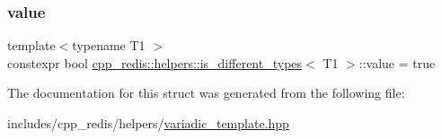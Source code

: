 \subsubsection{\texorpdfstring{value}{value}}
{\footnotesize\ttfamily template$<$typename T1 $>$ \\
constexpr bool \hyperlink{structcpp__redis_1_1helpers_1_1is__different__types}{cpp\+\_\+redis\+::helpers\+::is\+\_\+different\+\_\+types}$<$ T1 $>$\+::value = true\hspace{0.3cm}{\ttfamily [static]}}



The documentation for this struct was generated from the following file\+:\begin{DoxyCompactItemize}
\item 
includes/cpp\+\_\+redis/helpers/\hyperlink{variadic__template_8hpp}{variadic\+\_\+template.\+hpp}\end{DoxyCompactItemize}
